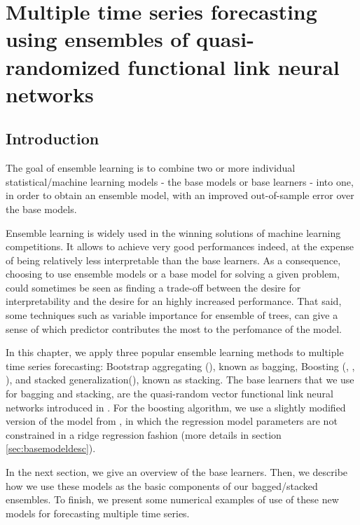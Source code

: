 %
\chapter{Multiple time series forecasting using ensembles of quasi-randomized functional link neural networks}
\label{sec:rvfl_ensembles}

\section{Introduction}

The goal of ensemble learning is to combine two or more individual statistical/machine learning models - the base models or base learners - into one, in order to obtain an ensemble model, with an improved out-of-sample error over the base models.

\medskip

Ensemble learning is widely used in the winning solutions of machine learning competitions. It allows to achieve very good performances indeed, at the expense of being relatively less interpretable than the base learners. As a consequence, choosing to use ensemble models or a base model for solving a given problem, could sometimes be seen as finding a trade-off between the desire for interpretability and the desire for an highly increased performance. That said, some techniques such as variable importance for ensemble of trees, can give a sense of which predictor contributes the most to the perfomance of the model.

\medskip

In this chapter, we apply three popular ensemble learning methods to multiple time series forecasting: Bootstrap aggregating (\cite{breiman1996bagging}), known as bagging, Boosting (\cite{friedman2001greedy}, \cite{buhlmann2003boosting}, \cite{hothorn2010model}), and stacked generalization(\cite{wolpert1992stacked}), known as stacking. The base learners that we use for bagging and stacking, are the quasi-random vector functional link neural networks introduced in \cite{moudiki2018multiple}. For the boosting algorithm, we use a slightly modified version of the model from \cite{moudiki2018multiple}, in which the regression model parameters are not constrained in a ridge regression fashion (more details in section \ref{sec:basemodeldesc}).

\medskip

In the next section, we give an overview of the base learners. Then, we describe how we use these models as the basic components of our bagged/stacked ensembles. To finish, we present some numerical examples of use of these new models for forecasting multiple time series.

